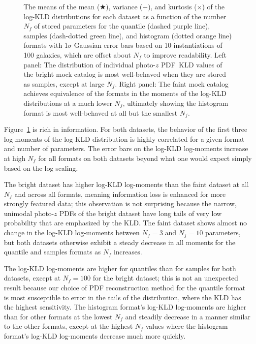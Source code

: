 \documentclass[\docopts]{\docclass}
\newcommand{\pz}{photo-$z$ PDF}
\newcommand{\mgdata}{bright\xspace}
\newcommand{\ssdata}{faint\xspace}
\begin{document}
\begin{figure}
\begin{center}
    \caption{
    The means of the mean ($\bigstar$), variance ($+$), and kurtosis ($\times$) 
of the log-KLD distributions for each dataset as a function of the number 
$N_{f}$ of stored parameters for the quantile (dashed purple line), samples 
(dash-dotted green line), and histogram (dotted orange line) formats with 
$1\sigma$ Gaussian error bars based on 10 instantiations of 100 galaxies, which 
are offset about $N_{f}$ to improve readability.
    Left panel: The distribution of individual \pz\ KLD values of the \mgdata 
mock catalog is most well-behaved when they are stored as samples, except at 
large $N_{f}$.
    Right panel: The \ssdata mock catalog achieves equivalence of the formats 
in the moments of the log-KLD distributions at a much lower $N_{f}$, ultimately 
showing the histogram format is most well-behaved at all but the smallest 
$N_{f}$.
    \label{fig:kld_moments}}
  \end{center}
\end{figure}

Figure~\ref{fig:kld_moments} is rich in information.
For both datasets, the behavior of the first three log-moments of the log-KLD 
distribution is highly correlated for a given format and number of parameters.
The error bars on the log-KLD log-moments increase at high $N_{f}$ for all 
formats on both datasets beyond what one would expect simply based on the log 
scaling.

The \mgdata dataset has higher log-KLD log-moments than the \ssdata dataset at 
all $N_{f}$ and across all formats, meaning information loss is enhanced for 
more strongly featured data; this observation is not surprising because the 
narrow, unimodal \pz s of the \mgdata dataset have long tails of very low 
probability that are emphasized by the KLD.
The \ssdata dataset shows almost no change in the log-KLD log-moments between 
$N_{f}=3$ and $N_{f}=10$ parameters, but both datasets otherwise exhibit a 
steady decrease in all moments for the quantile and samples formats as $N_{f}$ 
increases.

The log-KLD log-moments are higher for quantiles than for samples for both 
datasets, except at $N_{f}=100$ for the \mgdata dataset; this is not an 
unexpected result because our choice of PDF reconstruction method for the 
quantile format is most susceptible to error in the tails of the distribution, 
where the KLD has the highest sensitivity.
The histogram format's log-KLD log-moments are higher than for other formats at 
the lowest $N_{f}$ and steadily decrease in a manner similar to the other 
formats, except at the highest $N_{f}$ values where the histogram format's 
log-KLD log-moments decrease much more quickly.
\end{document}
